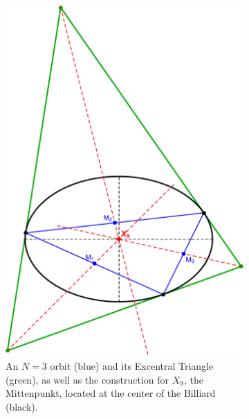 \begin{figure}[H]
     \centering
     \begin{subfigure}[t]{0.29\textwidth}
         \centering
         \includegraphics[height=1.75\linewidth]{pics/0051_mitten.pdf}
         \caption{An $N=3$ orbit (blue) and its Excentral Triangle (green), as well as the construction for $X_9$, the Mittenpunkt, located at the center of the Billiard (black).}
         \label{fig:mitten}
     \end{subfigure}
     \hfill
     \begin{subfigure}[t]{0.29\textwidth}

\end{subfigure}
\end{figure}
